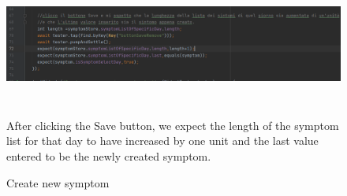 \documentclass [12pt]{article}
\begin{document}
\begin{itemize}[•]
\begin{figure}[h!]
\centering
\includegraphics[width=\linewidth,height=4cm]{CreazioneSymptom.PNG}
\caption{Create new symptom}
\medskip
\small
After clicking the Save button, we expect the length of the symptom list for that day to have increased by one unit and the last value entered to be the newly created symptom.
\end{figure}

\end{itemize}


\clearpage
\end{document}
